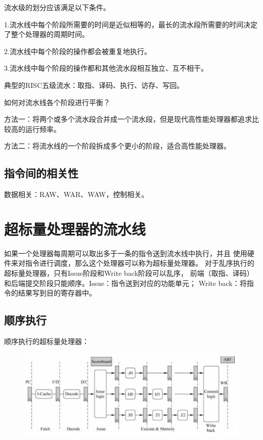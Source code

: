 \documentclass{article}
\begin{document}
  流水级的划分应该满足以下条件。

  1.流水线中每个阶段所需要的时间是近似相等的，最长的流水段所需要的时间决定了整个处理器的周期时间。

  2.流水线中每个阶段的操作都会被重复地执行。

  3.流水线中每个阶段的操作都和其他流水段相互独立、互不相干。

  典型的RISC五级流水：取指、译码、执行、访存、写回。

  如何对流水线各个阶段进行平衡？

  方法一：将两个或多个流水段合并成一个流水段，但是现代高性能处理器都追求比较高的运行频率。

  方法二：将流水线的一个阶段拆成多个更小的阶段，适合高性能处理器。

  \subsection{指令间的相关性}

  数据相关：RAW、WAR、WAW，控制相关。

  \section{超标量处理器的流水线}

  如果一个处理器每周期可以取出多于一条的指令送到流水线中执行，并且
  使用硬件来对指令进行调度，那么这个处理器可以称为超标量处理器。
  对于乱序执行的超标量处理器，只有Issue阶段和Write back阶段可以乱序，
  前端（取指、译码）和后端提交阶段只能顺序。Issue：指令送到对应的功能单元；
  Write back：将指令的结果写到目的寄存器中。

  \subsection{顺序执行}

  顺序执行的超标量处理器：
  \begin{figure}[H]
    \centering
    \includegraphics[width=14cm]{./figures/chap1_inorder_CPU.jpg}
  \end{figure}
\end{document}

